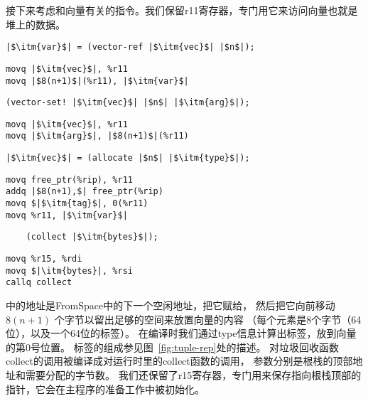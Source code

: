 接下来考虑和向量有关的指令。我们保留r11寄存器，专门用它来访问向量也就是堆上的数据。
\begin{transformation}
\begin{lstlisting}
|$\itm{var}$| = (vector-ref |$\itm{vec}$| |$n$|);
\end{lstlisting}
\compilesto
\begin{lstlisting}
movq |$\itm{vec}$|, %r11
movq |$8(n+1)$|(%r11), |$\itm{var}$|
\end{lstlisting}
\end{transformation}

\begin{transformation}
\begin{lstlisting}
(vector-set! |$\itm{vec}$| |$n$| |$\itm{arg}$|);
\end{lstlisting}
\compilesto
\begin{lstlisting}
movq |$\itm{vec}$|, %r11
movq |$\itm{arg}$|, |$8(n+1)$|(%r11)
\end{lstlisting}
\end{transformation}

\begin{transformation}
\begin{lstlisting}
|$\itm{vec}$| = (allocate |$n$| |$\itm{type}$|);
\end{lstlisting}
\compilesto
\begin{lstlisting}
movq free_ptr(%rip), %r11
addq |$8(n+1),$| free_ptr(%rip)
movq $|$\itm{tag}$|, 0(%r11)
movq %r11, |$\itm{var}$|
\end{lstlisting}
\end{transformation}

\begin{transformation}
\begin{lstlisting}
    (collect |$\itm{bytes}$|);
\end{lstlisting}
\compilesto
\begin{lstlisting}
movq %r15, %rdi
movq $|\itm{bytes}|, %rsi
callq collect
\end{lstlisting}
\end{transformation}

中的地址是FromSpace中的下一个空闲地址，把它赋给，
然后把它向前移动$8(n+1)$ 个字节以留出足够的空间来放置向量的内容
（每个元素是8个字节（64位），以及一个64位的标签）。
在编译时我们通过type信息计算出标签，放到向量的第0号位置。
标签的组成参见图~\ref{fig:tuple-rep}处的描述。
对垃圾回收函数collect的调用被编译成对运行时里的collect函数的调用，
参数分别是根栈的顶部地址和需要分配的字节数。
我们还保留了r15寄存器，专门用来保存指向根栈顶部的指针，它会在主程序的准备工作中被初始化。

